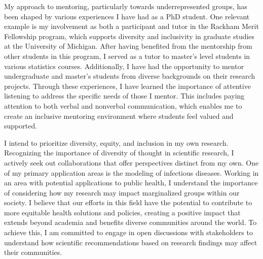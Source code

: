 \documentclass[11pt]{article}
\begin{document}
My approach to mentoring, particularly towards underrepresented groups, has been shaped by various experiences I have had as a PhD student.
One relevant example is my involvement as both a participant and tutor in the Rackham Merit Fellowship program, which supports diversity and inclusivity in graduate studies at the University of Michigan.
After having benefited from the mentorship from other students in this program, I served as a tutor to master's level students in various statistics courses.
Additionally, I have had the opportunity to mentor undergraduate and master's students from diverse backgrounds on their research projects.
Through these experiences, I have learned the importance of attentive listening to address the specific needs of those I mentor.
This includes paying attention to both verbal and nonverbal communication, which enables me to create an inclusive mentoring environment where students feel valued and supported.

I intend to prioritize diversity, equity, and inclusion in my own research.
Recognizing the importance of diversity of thought in scientific research, I actively seek out collaborations that offer perspectives distinct from my own.
One of my primary application areas is the modeling of infectious diseases.
Working in an area with potential applications to public health, I understand the importance of considering how my research may impact marginalized groups within our society.
I believe that our efforts in this field have the potential to contribute to more equitable health solutions and policies, creating a positive impact that extends beyond academia and benefits diverse communities around the world.
To achieve this, I am committed to engage in open discussions with stakeholders to understand how scientific recommendations based on research findings may affect their communities.



\end{document}
